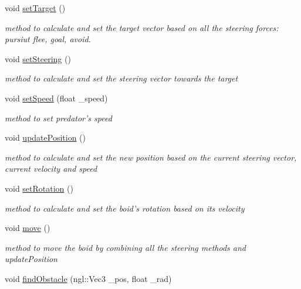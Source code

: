 \begin{DoxyCompactItemize}
void \hyperlink{classPredator_a0c4314fa80d722c9ab993f9503e78c97}{setTarget} ()
\begin{DoxyCompactList}\small\item\em method to calculate and set the target vector based on all the steering forces: pursiut flee, goal, avoid. \item\end{DoxyCompactList}\item 
void \hyperlink{classPredator_a8f2a2bec2b92689dbd78a6081269e7cb}{setSteering} ()
\begin{DoxyCompactList}\small\item\em method to calculate and set the steering vector towards the target \item\end{DoxyCompactList}\item 
void \hyperlink{classPredator_a2383f6147e78a4b6f632144466758fbb}{setSpeed} (float \_\-speed)
\begin{DoxyCompactList}\small\item\em method to set predator's speed \item\end{DoxyCompactList}\item 
void \hyperlink{classPredator_a6bafa78814bd9b01178afb95aec24359}{updatePosition} ()
\begin{DoxyCompactList}\small\item\em method to calculate and set the new position based on the current steering vector, current velocity and speed \item\end{DoxyCompactList}\item 
void \hyperlink{classPredator_a89c3ac6389663d791050734cd3a62e32}{setRotation} ()
\begin{DoxyCompactList}\small\item\em method to calculate and set the boid's rotation based on its velocity \item\end{DoxyCompactList}\item 
void \hyperlink{classPredator_ac387f969b16cf3651b097f4470368683}{move} ()
\begin{DoxyCompactList}\small\item\em method to move the boid by combining all the steering methods and updatePosition \item\end{DoxyCompactList}\item 
void \hyperlink{classPredator_ac64cea17ca069465ffdc6e70161afe84}{findObstacle} (ngl::Vec3 \_\-pos, float \_\-rad)

\end{DoxyCompactItemize}
